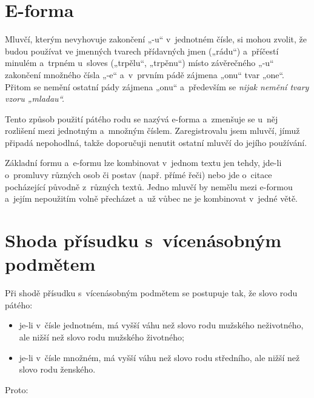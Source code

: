 %
%
%
\section{E-forma}

Mluvčí, kterým nevyhovuje zakončení „-u“ v jednotném čísle, si mohou zvolit,
že budou používat ve jmenných tvarech přídavných jmen („rádu“)
a příčestí minulém a trpném u sloves („trpělu“, „trpěnu“) místo
závěrečného „-u“ zakončení množného čísla „-e“ a v prvním pádě
zájmena „onu“ tvar „one“. Přitom se nemění ostatní pády zájmena „onu“
a především se \emph{nijak nemění tvary vzoru „mladau“.}

Tento způsob použití pátého rodu se nazývá e-forma a zmenšuje se u něj
rozlišení mezi jednotným a množným číslem. Zaregistrovalu jsem mluvčí,
jímuž připadá nepohodlná, takže doporučuji nenutit ostatní mluvčí
do jejího používání.

Základní formu a e-formu lze kombinovat v jednom textu jen tehdy,
jde-li o promluvy různých osob či postav (např. přímé řeči) nebo jde
o citace pocházející původně z různých textů. Jedno mluvčí by nemělu
mezi e-formou a jejím nepoužitím volně přecházet a už vůbec ne
je kombinovat v jedné větě.

\section{Shoda přísudku s vícenásobným podmětem}

Při shodě přísudku s vícenásobným podmětem se postupuje tak,
že slovo rodu pátého:
\begin{itemize}
\item je-li v čísle jednotném, má vyšší váhu než
slovo rodu mužského neživotného, ale nižší než slovo rodu mužského
životného;
\item je-li v čísle množném, má vyšší váhu než
slovo rodu středního, ale nižší než slovo rodu ženského.
\end{itemize}

\noindent Proto:

